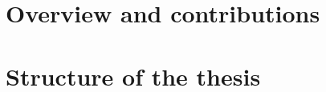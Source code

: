 \begin{refsection}
\section{Overview and contributions}\label{sec:overview-and-contributions}

\section{Structure of the thesis}\label{sec:structure-of-the-thesis}

\end{refsection}